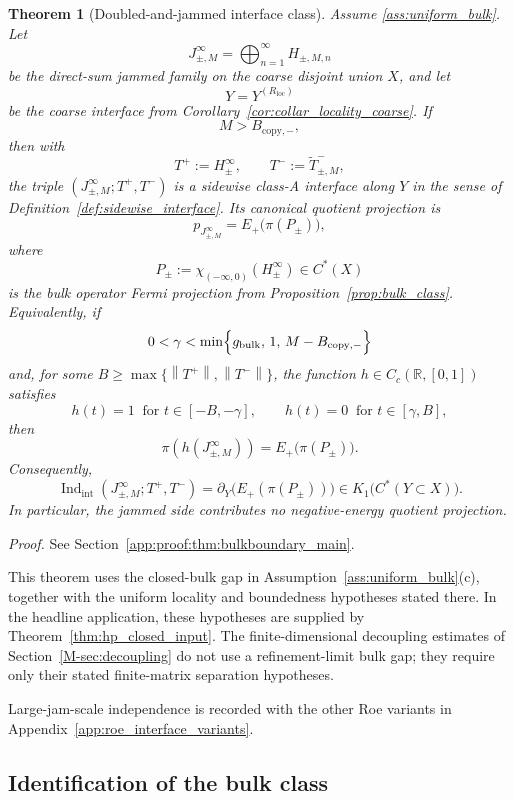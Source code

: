 \documentclass[11pt]{article}
\numberwithin{equation}{section}
\newtheorem{theorem}{Theorem}[section]
\theoremstyle{definition}
\theoremstyle{remark}
\newcommand{\proofref}[1]{%
  \par\noindent\emph{Proof.} See Section~\ref{#1}.\par\medskip
}
\newcommand{\proofappendixref}[1]{\proofref{#1}}
\newcommand{\opnorm}[1]{\left\lVert#1\right\rVert}
\newcommand{\Indint}{\operatorname{Ind}_{\mathrm{int}}}
\begin{document}
\begin{theorem}[Doubled-and-jammed interface class]\label{thm:bulkboundary_main}
Assume \ref{ass:uniform_bulk}. Let
\[
J_{\pm,M}^\infty=\bigoplus_{n=1}^\infty H_{\pm,M,n}
\]
be the direct-sum jammed family on the coarse disjoint union $X$, and let
\[
Y=Y^{(R_{\mathrm{loc}})}
\]
be the coarse interface from Corollary~\ref{cor:collar_locality_coarse}. If
\[
M>B_{\mathrm{copy},-},
\]
then with
\[
T^+:=H_\pm^\infty,
\qquad
T^-:=\widetilde T^-_{\pm,M},
\]
the triple $(J_{\pm,M}^\infty;T^+,T^-)$ is a sidewise class-A interface along $Y$ in the sense of
Definition~\ref{def:sidewise_interface}. Its canonical quotient projection is
\begin{equation}\label{eq:quotient_fermi_projection}
p_{J_{\pm,M}^\infty}=E_+\!\bigl(\pi(P_\pm)\bigr),
\end{equation}
where
\[
P_\pm:=\chi_{(-\infty,0)}(H_\pm^\infty)\in C^*(X)
\]
is the bulk operator Fermi projection from Proposition~\ref{prop:bulk_class}. Equivalently, if
\[
0<\gamma<\min\Bigl\{g_{\mathrm{bulk}},\,1,\,M-B_{\mathrm{copy},-}\Bigr\}
\]
and, for some $B\ge\max\{\opnorm{T^+},\opnorm{T^-}\}$, the function
$h\in C_c(\mathbb R,[0,1])$ satisfies
\[
h(t)=1\ \text{ for }t\in[-B,-\gamma],
\qquad
h(t)=0\ \text{ for }t\in[\gamma,B],
\]
then
\[
\pi(h(J_{\pm,M}^\infty))=E_+\!\bigl(\pi(P_\pm)\bigr).
\]
Consequently,
\begin{equation}\label{eq:main_interface_class}
\Indint(J_{\pm,M}^\infty;T^+,T^-)
=
\partial_Y\!\bigl(E_+(\pi(P_\pm))\bigr)
\in K_1\!\bigl(C^*(Y\subset X)\bigr).
\end{equation}
In particular, the jammed side contributes no negative-energy quotient projection.
\end{theorem}
\proofappendixref{app:proof:thm:bulkboundary_main}


This theorem uses the closed-bulk gap in Assumption~\ref{ass:uniform_bulk}(c), together with the
uniform locality and boundedness hypotheses stated there. In the headline application,
these hypotheses are supplied by Theorem~\ref{thm:hp_closed_input}. The finite-dimensional
decoupling estimates of Section~\ref{M-sec:decoupling} do not use a refinement-limit bulk gap; they
require only their stated finite-matrix separation hypotheses.



Large-jam-scale independence is recorded with the other Roe variants in Appendix~\ref{app:roe_interface_variants}.

\subsection{Identification of the bulk class}
\end{document}
